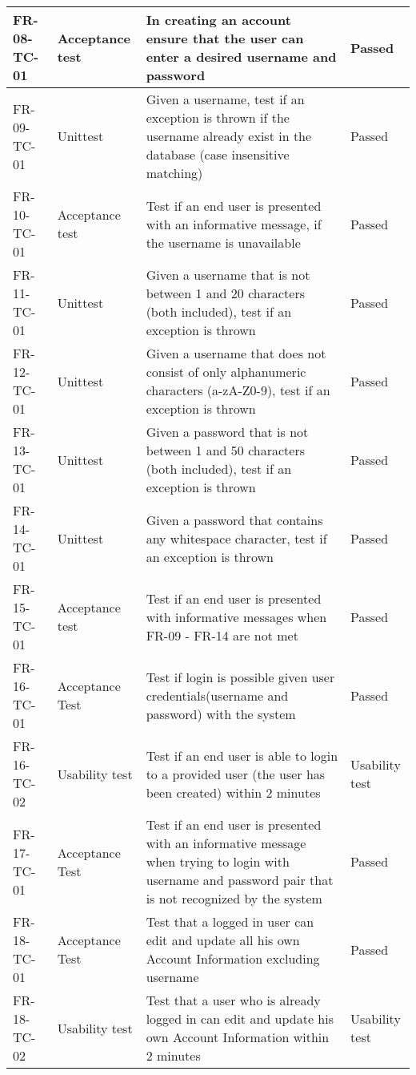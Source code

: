 \documentclass[../report.tex]{subfiles}
\begin{document}
\begin{longtable}{|L{2.1cm}|L{3cm}|C{7.5cm}|L{3cm}|}
FR-08-TC-01&Acceptance test&In creating an account ensure that the user can enter a desired username and password&Passed  \\ \hline
FR-09-TC-01&Unittest&Given a username, test if an exception is thrown if the username already exist in the database (case insensitive matching)&Passed  \\ \hline
FR-10-TC-01&Acceptance test&Test if an end user is presented with an informative message, if the username is unavailable&Passed  \\ \hline
FR-11-TC-01&Unittest&Given a username that is not between 1 and 20 characters (both included), test if an exception is thrown&Passed  \\ \hline
FR-12-TC-01&Unittest&Given a username that does not consist of only alphanumeric characters (a-zA-Z0-9), test if an exception is thrown&Passed  \\ \hline
FR-13-TC-01&Unittest&Given a password that is not between 1 and 50 characters (both included), test if an exception is thrown&Passed  \\ \hline
FR-14-TC-01&Unittest&Given a password that contains any whitespace character, test if an exception is thrown&Passed  \\ \hline
FR-15-TC-01&Acceptance test&Test if an end user is presented with informative messages when FR-09 - FR-14 are not met&Passed  \\ \hline
FR-16-TC-01&Acceptance Test&Test if login is possible given user credentials(username and password) with the system&Passed  \\ \hline
FR-16-TC-02&Usability test&Test if an end user is able to login to a provided user (the user has been created) within 2 minutes&Usability test  \\ \hline
FR-17-TC-01&Acceptance Test&Test if an end user is presented with an informative message when trying to login with username and password pair that is not recognized by the system&Passed  \\ \hline
FR-18-TC-01&Acceptance Test&Test that a logged in user can edit and update all his own Account Information excluding username&Passed  \\ \hline
FR-18-TC-02&Usability test&Test that a user who is already logged in can edit and update his own Account Information within 2 minutes&Usability test  \\ \hline

\end{longtable}
\end{document}
